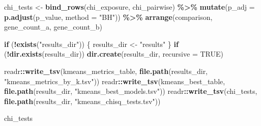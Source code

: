 \documentclass[
]{article}
\newenvironment{Shaded}{\begin{snugshade}}{\end{snugshade}}
\newcommand{\AttributeTok}[1]{\textcolor[rgb]{0.13,0.29,0.53}{#1}}
\newcommand{\ConstantTok}[1]{\textcolor[rgb]{0.56,0.35,0.01}{#1}}
\newcommand{\ControlFlowTok}[1]{\textcolor[rgb]{0.13,0.29,0.53}{\textbf{#1}}}
\newcommand{\FunctionTok}[1]{\textcolor[rgb]{0.13,0.29,0.53}{\textbf{#1}}}
\newcommand{\NormalTok}[1]{#1}
\newcommand{\OtherTok}[1]{\textcolor[rgb]{0.56,0.35,0.01}{#1}}
\newcommand{\SpecialCharTok}[1]{\textcolor[rgb]{0.81,0.36,0.00}{\textbf{#1}}}
\newcommand{\StringTok}[1]{\textcolor[rgb]{0.31,0.60,0.02}{#1}}
\begin{document}
\begin{Shaded}
\begin{Highlighting}[]
\NormalTok{chi\_tests }\OtherTok{\textless{}{-}} \FunctionTok{bind\_rows}\NormalTok{(chi\_exposure, chi\_pairwise) }\SpecialCharTok{\%\textgreater{}\%}
    \FunctionTok{mutate}\NormalTok{(}\AttributeTok{p\_adj =} \FunctionTok{p.adjust}\NormalTok{(p\_value, }\AttributeTok{method =} \StringTok{"BH"}\NormalTok{)) }\SpecialCharTok{\%\textgreater{}\%}
    \FunctionTok{arrange}\NormalTok{(comparison, gene\_count\_a, gene\_count\_b)}

\ControlFlowTok{if}\NormalTok{ (}\SpecialCharTok{!}\FunctionTok{exists}\NormalTok{(}\StringTok{"results\_dir"}\NormalTok{)) \{}
\NormalTok{    results\_dir }\OtherTok{\textless{}{-}} \StringTok{"results"}
\NormalTok{\}}
\ControlFlowTok{if}\NormalTok{ (}\SpecialCharTok{!}\FunctionTok{dir.exists}\NormalTok{(results\_dir)) }\FunctionTok{dir.create}\NormalTok{(results\_dir, }\AttributeTok{recursive =} \ConstantTok{TRUE}\NormalTok{)}

\NormalTok{readr}\SpecialCharTok{::}\FunctionTok{write\_tsv}\NormalTok{(kmeans\_metrics\_table, }\FunctionTok{file.path}\NormalTok{(results\_dir, }\StringTok{"kmeans\_metrics\_by\_k.tsv"}\NormalTok{))}
\NormalTok{readr}\SpecialCharTok{::}\FunctionTok{write\_tsv}\NormalTok{(kmeans\_best\_table, }\FunctionTok{file.path}\NormalTok{(results\_dir, }\StringTok{"kmeans\_best\_models.tsv"}\NormalTok{))}
\NormalTok{readr}\SpecialCharTok{::}\FunctionTok{write\_tsv}\NormalTok{(chi\_tests, }\FunctionTok{file.path}\NormalTok{(results\_dir, }\StringTok{"kmeans\_chisq\_tests.tsv"}\NormalTok{))}

\NormalTok{chi\_tests}
\end{Highlighting}
\end{Shaded}
\end{document}
